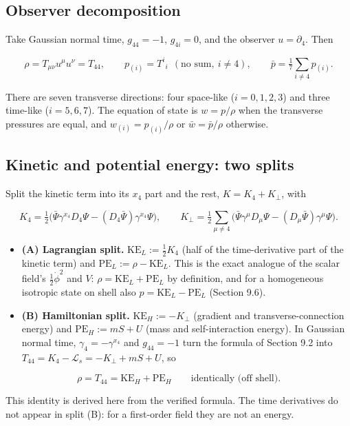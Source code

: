 \documentclass[11pt]{article}
\begin{document}
\subsection{Observer decomposition}

Take Gaussian normal time, $g_{44}=-1$, $g_{4i}=0$, and the observer $u=\partial_4$. Then

\[
\rho=T_{\mu\nu}u^\mu u^\nu=T_{44},\qquad p_{(i)}=T^i{}_i\ \ (\text{no sum},\ i\ne4),\qquad \bar p=\tfrac17\sum_{i\ne4}p_{(i)} .
\]

There are seven transverse directions: four space-like ($i=0,1,2,3$) and three time-like ($i=5,6,7$). The equation of state is $w=p/\rho$ when the transverse pressures are equal, and $w_{(i)}=p_{(i)}/\rho$ or $\bar w=\bar p/\rho$ otherwise.

\subsection{Kinetic and potential energy: two splits}

Split the kinetic term into its $x_4$ part and the rest, $K=K_4+K_\perp$, with

\[
K_4=\tfrac12\bigl(\bar\Psi\gamma^{x_4}D_4\Psi-(D_4\bar\Psi)\gamma^{x_4}\Psi\bigr),\qquad K_\perp=\tfrac12\sum_{\mu\ne4}\bigl(\bar\Psi\gamma^\mu D_\mu\Psi-(D_\mu\bar\Psi)\gamma^\mu\Psi\bigr).
\]

\begin{itemize}
\item \textbf{(A) Lagrangian split.} $\mathrm{KE}_L:=\tfrac12K_4$ (half of the time-derivative part of the kinetic term) and $\mathrm{PE}_L:=\rho-\mathrm{KE}_L$. This is the exact analogue of the scalar field's $\tfrac12\dot\phi^2$ and $V$: $\rho=\mathrm{KE}_L+\mathrm{PE}_L$ by definition, and for a homogeneous isotropic state on shell also $p=\mathrm{KE}_L-\mathrm{PE}_L$ (Section 9.6).
\item \textbf{(B) Hamiltonian split.} $\mathrm{KE}_H:=-K_\perp$ (gradient and transverse-connection energy) and $\mathrm{PE}_H:=mS+U$ (mass and self-interaction energy). In Gaussian normal time, $\gamma_4=-\gamma^{x_4}$ and $g_{44}=-1$ turn the formula of Section 9.2 into $T_{44}=K_4-\mathcal L_s=-K_\perp+mS+U$, so
\end{itemize}

\[
\rho=T_{44}=\mathrm{KE}_H+\mathrm{PE}_H\qquad\text{identically (off shell)}.
\]

This identity is derived here from the verified formula. The time derivatives do not appear in split (B): for a first-order field they are not an energy.
\end{document}
